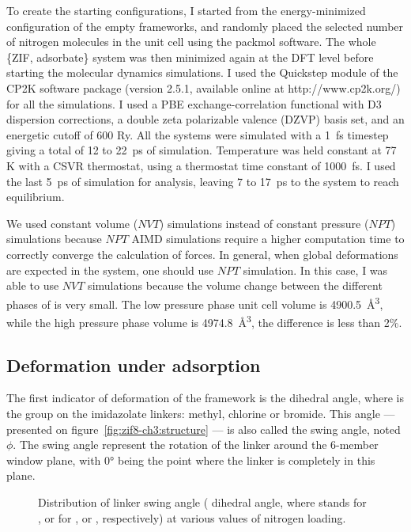 \documentclass[thesis]{subfiles}
\begin{document}
To create the starting configurations, I started from the energy-minimized
configuration of the empty frameworks, and randomly placed the selected number
of nitrogen molecules in the unit cell using the packmol
software\cite{Martnez2009}. The whole \{ZIF, adsorbate\} system was then
minimized again at the DFT level before starting the molecular dynamics
simulations. I used the Quickstep module\cite{VandeVondele2005} of the CP2K
software package (version 2.5.1, available online at http://www.cp2k.org/) for
all the simulations. I used a PBE exchange-correlation functional with D3
dispersion corrections, a double zeta polarizable valence (DZVP) basis set, and
an energetic cutoff of 600 Ry. All the systems were simulated with a \SI{1}{fs}
timestep giving a total of 12 to \SI{22}{ps} of simulation. Temperature was held
constant at 77 K with a CSVR thermostat, using a thermostat time constant of
\SI{1000}{fs}. I used the last \SI{5}{ps} of simulation for analysis, leaving 7
to \SI{17}{ps} to the system to reach equilibrium.

We used constant volume ($NVT$) simulations instead of constant pressure ($NPT$)
simulations because $NPT$ AIMD simulations require a higher computation time to
correctly converge the calculation of forces. In general, when global
deformations are expected in the system, one should use $NPT$ simulation. In
this case, I was able to use $NVT$ simulations because the volume change between
the different phases of  is very small. The low pressure phase unit cell
volume is \SI{4900.5}{\AA^3}, while the high pressure phase volume is
\SI{4974.8}{\AA^3}, the difference is less than 2\%.

\subsection{Deformation under adsorption}
\label{sec:zif8x:swing}

The first indicator of deformation of the framework is the 
dihedral angle, where  is the group on the imidazolate linkers: methyl,
chlorine or bromide. This angle --- presented on
figure~\ref{fig:zif8-ch3:structure} --- is also called the swing angle, noted
$\phi$. The swing angle represent the rotation of the linker around the 6-member
window plane, with 0° being the point where the linker is completely in this
plane.

\begin{figure}[ht]
    \centering
    
    \caption{Distribution of linker swing angle ( dihedral angle,
    where  stands for ,  or  for , \ZIFCl or
    \ZIFBr, respectively) at various values of nitrogen loading.}
    \label{fig:zif8x:dihedrals}
\end{figure}
\end{document}
